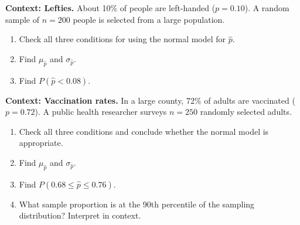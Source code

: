 \documentclass[10pt]{article}
\begin{document}
\namepartnerperiod

\vspace{0.1in}

\begin{tcolorbox}[colback=redbg, colframe=black!40, boxrule=0.6pt, arc=2mm,
    left=3mm, right=3mm, top=2mm, bottom=2mm, title=\textbf{Tier R --- Remediate}]
\textbf{Context: Lefties.}
About 10\% of people are left-handed ($p = 0.10$). A random sample of $n = 200$ people
is selected from a large population.

\begin{enumerate}
  \item Check all three conditions for using the normal model for $\hat{p}$.
  \item Find $\mu_{\hat{p}}$ and $\sigma_{\hat{p}}$.
        \vspace{0.6in}
  \item Find $P(\hat{p} < 0.08)$.
        \vspace{0.9in}
\end{enumerate}
\end{tcolorbox}

\vspace{0.12in}

\begin{tcolorbox}[colback=redbg, colframe=black!40, boxrule=0.6pt, arc=2mm,
    left=3mm, right=3mm, top=2mm, bottom=2mm, title=\textbf{Tier A --- Approaching Proficiency}]
\textbf{Context: Vaccination rates.}
In a large county, 72\% of adults are vaccinated ($p = 0.72$). A public health researcher
surveys $n = 250$ randomly selected adults.

\begin{enumerate}
  \item Check all three conditions and conclude whether the normal model is appropriate.
  \item Find $\mu_{\hat{p}}$ and $\sigma_{\hat{p}}$.
        \vspace{0.5in}
  \item Find $P(0.68 \le \hat{p} \le 0.76)$.
        \vspace{0.9in}
  \item What sample proportion is at the 90th percentile of the sampling distribution?
        Interpret in context.
        \vspace{0.9in}
\end{enumerate}
\end{tcolorbox}
\end{document}
